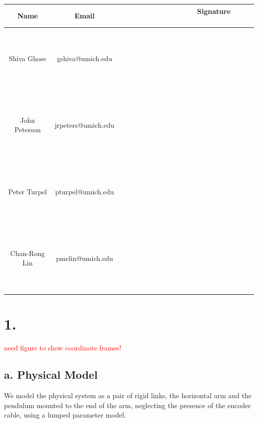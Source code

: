 \documentclass{article}
\newcommand{\xxx}[1]{\textcolor{red}{#1}}
\theoremstyle{plain}
\theoremstyle{definition}
\theoremstyle{remark}
\begin{document}
\begin{table}[h]
\begin{center}
    \begin{tabular}{|c|c|c|}
        \hline
        \textbf{Name} & \textbf{Email}     & \textbf{ \ \ \ \ \  \ \  \ \ \ \ \  \ \ Signature  \ \ \ \ \  \ \ \ \ \ \ \  \ \ } \\ \hline
        	~& ~& ~\\
	~& ~& ~\\
	Shiva Ghose   & gshiva@umich.edu   & ~                  \\
	~& ~& ~\\
	~& ~& ~\\ \hline 
	~& ~& ~\\
	~& ~& ~\\
        John Peterson & jrpeters@umich.edu & ~                  \\ 
	~& ~& ~\\
	~& ~& ~\\ \hline 
	~& ~& ~\\
	~& ~& ~\\
        Peter Turpel   & pturpel@umich.edu & ~                  \\
	~& ~& ~\\
	~& ~& ~\\ \hline 
	~& ~& ~\\
	~& ~& ~\\
        Chan-Rong Lin   & pmelin@umich.edu & ~                  \\
	~& ~& ~\\
	~& ~& ~\\ \hline 
        \hline
    \end{tabular}
\end{center}
\end{table}

\newpage

\section*{1.}

\xxx{need figure to show coordinate frames!}
\subsection*{a. Physical Model}
We model the physical system as a pair of rigid links, the horizontal arm and the pendulum mounted to the end of the arm, neglecting the presence of the encoder cable, using a lumped parameter model.
\end{document}
